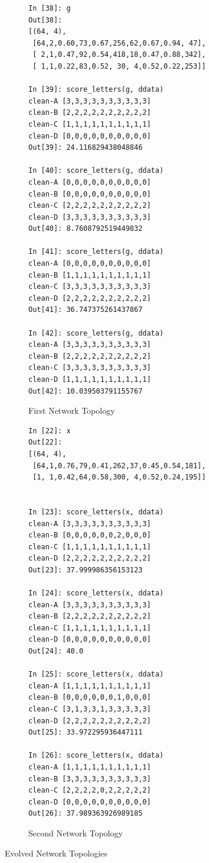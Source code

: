 \documentclass[12pt,a4paper]{article}
\begin{document}
\begin{figure}[H]
\begin{subfigure}[b]{.5\linewidth}
\centering
\begin{lstlisting}[basicstyle=\scriptsize\ttfamily]
In [38]: g
Out[38]:
[(64, 4),
 [64,2,0.60,73,0.67,256,62,0.67,0.94, 47],
 [ 2,1,0.47,92,0.54,418,18,0.47,0.88,342],
 [ 1,1,0.22,83,0.52, 30, 4,0.52,0.22,253]]

In [39]: score_letters(g, ddata)
clean-A [3,3,3,3,3,3,3,3,3,3]
clean-B [2,2,2,2,2,2,2,2,2,2]
clean-C [1,1,1,1,1,1,1,1,1,1]
clean-D [0,0,0,0,0,0,0,0,0,0]
Out[39]: 24.116829438048846

In [40]: score_letters(g, ddata)
clean-A [0,0,0,0,0,0,0,0,0,0]
clean-B [0,0,0,0,0,0,0,0,0,0]
clean-C [2,2,2,2,2,2,2,2,2,2]
clean-D [3,3,3,3,3,3,3,3,3,3]
Out[40]: 8.7608792519449832

In [41]: score_letters(g, ddata)
clean-A [0,0,0,0,0,0,0,0,0,0]
clean-B [1,1,1,1,1,1,1,1,1,1]
clean-C [3,3,3,3,3,3,3,3,3,3]
clean-D [2,2,2,2,2,2,2,2,2,2]
Out[41]: 36.747375261437867

In [42]: score_letters(g, ddata)
clean-A [3,3,3,3,3,3,3,3,3,3]
clean-B [2,2,2,2,2,2,2,2,2,2]
clean-C [3,3,3,3,3,3,3,3,3,3]
clean-D [1,1,1,1,1,1,1,1,1,1]
Out[42]: 10.039503791155767
\end{lstlisting}
\caption{First Network Topology}
\end{subfigure}
\begin{subfigure}[b]{.5\linewidth}
\centering
\begin{lstlisting}[basicstyle=\scriptsize\ttfamily]
In [22]: x
Out[22]:
[(64, 4),
 [64,1,0.76,79,0.41,262,37,0.45,0.54,181],
 [1, 1,0.42,64,0.58,300, 4,0.52,0.24,195]]
 

In [23]: score_letters(x, ddata)
clean-A [3,3,3,3,3,3,3,3,3,3]
clean-B [0,0,0,0,0,0,2,0,0,0]
clean-C [1,1,1,1,1,1,1,1,1,1]
clean-D [2,2,2,2,2,2,2,2,2,2]
Out[23]: 37.999986356153123

In [24]: score_letters(x, ddata)
clean-A [3,3,3,3,3,3,3,3,3,3]
clean-B [2,2,2,2,2,2,2,2,2,2]
clean-C [1,1,1,1,1,1,1,1,1,1]
clean-D [0,0,0,0,0,0,0,0,0,0]
Out[24]: 40.0

In [25]: score_letters(x, ddata)
clean-A [1,1,1,1,1,1,1,1,1,1]
clean-B [0,0,0,0,0,0,1,0,0,0]
clean-C [3,1,3,3,1,3,3,3,3,3]
clean-D [2,2,2,2,2,2,2,2,2,2]
Out[25]: 33.972295936447111

In [26]: score_letters(x, ddata)
clean-A [1,1,1,1,1,1,1,1,1,1]
clean-B [3,3,3,3,3,3,3,3,3,3]
clean-C [2,2,2,2,0,2,2,2,2,2]
clean-D [0,0,0,0,0,0,0,0,0,0]
Out[26]: 37.989363926989185
\end{lstlisting}
\caption{Second Network Topology}

\end{subfigure}
\caption{Evolved Network Topologies}
\label{fig:letter}
\end{figure}
\end{document}
